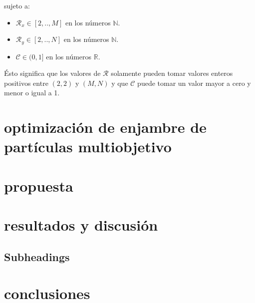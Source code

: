 \documentclass[spanish]{article}
\begin{document}
sujeto a:

\begin{itemize}
\item $\mathcal{R}_x \in [2,..,M]$ en los números $\mathbb{N}$.
\item $\mathcal{R}_y \in [2,..,N]$ en los números $\mathbb{N}$.
\item $\mathscr{C} \in (0,1]$ en los números $\mathbb{R}$.
\end{itemize}

Ésto significa que los valores de $\mathcal{R}$ solamente pueden tomar valores enteros positivos entre $(2,2)$ y $(M,N)$ y que $\mathscr{C}$ puede tomar un valor mayor a cero y menor o igual a 1.

\section{optimización de enjambre de partículas multiobjetivo}
\label{sec:pagestyle}

\section{propuesta}
\label{sec:typestyle}


\section{resultados y discusión}
\label{sec:majhead}


\subsection{Subheadings}
\label{ssec:subhead}

 

\section{conclusiones}
\label{sec:print}


\end{document}
